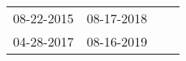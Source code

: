 \begin{supertabular}{llll}
 08-22-2015 &  08-17-2018 \\
 04-28-2017 &  08-16-2019 \\
\end{supertabular}

